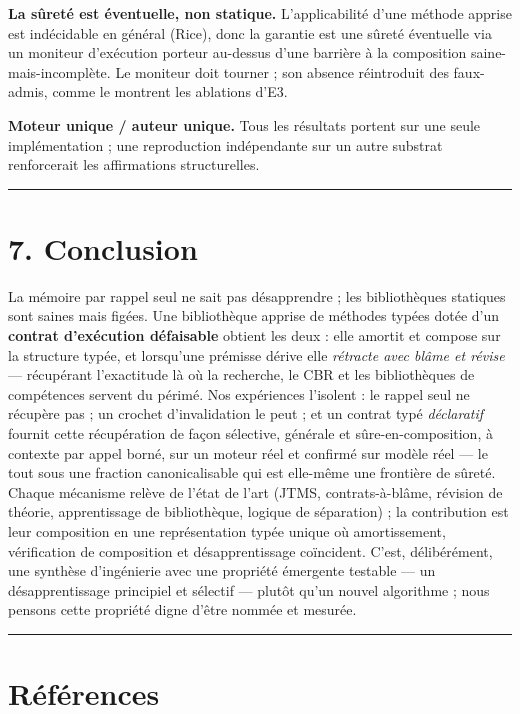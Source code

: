 \documentclass[11pt]{article}
\begin{document}
\textbf{La sûreté est éventuelle, non statique.} L'applicabilité d'une méthode apprise est indécidable en général (Rice), donc la garantie est une sûreté éventuelle via un moniteur d'exécution porteur au-dessus d'une barrière à la composition saine-mais-incomplète. Le moniteur doit tourner ; son absence réintroduit des faux-admis, comme le montrent les ablations d'E3.

\textbf{Moteur unique / auteur unique.} Tous les résultats portent sur une seule implémentation ; une reproduction indépendante sur un autre substrat renforcerait les affirmations structurelles.

\medskip\hrule\medskip

\section*{7. Conclusion}

La mémoire par rappel seul ne sait pas désapprendre ; les bibliothèques statiques sont saines mais figées. Une bibliothèque apprise de méthodes typées dotée d'un \textbf{contrat d'exécution défaisable} obtient les deux : elle amortit et compose sur la structure typée, et lorsqu'une prémisse dérive elle \emph{rétracte avec blâme et révise} — récupérant l'exactitude là où la recherche, le CBR et les bibliothèques de compétences servent du périmé. Nos expériences l'isolent : le rappel seul ne récupère pas ; un crochet d'invalidation le peut ; et un contrat typé \emph{déclaratif} fournit cette récupération de façon sélective, générale et sûre-en-composition, à contexte par appel borné, sur un moteur réel et confirmé sur modèle réel — le tout sous une fraction canonicalisable qui est elle-même une frontière de sûreté. Chaque mécanisme relève de l'état de l'art (JTMS, contrats-à-blâme, révision de théorie, apprentissage de bibliothèque, logique de séparation) ; la contribution est leur composition en une représentation typée unique où amortissement, vérification de composition et désapprentissage coïncident. C'est, délibérément, une synthèse d'ingénierie avec une propriété émergente testable — un désapprentissage principiel et sélectif — plutôt qu'un nouvel algorithme ; nous pensons cette propriété digne d'être nommée et mesurée.

\medskip\hrule\medskip

\section*{Références}
\end{document}
